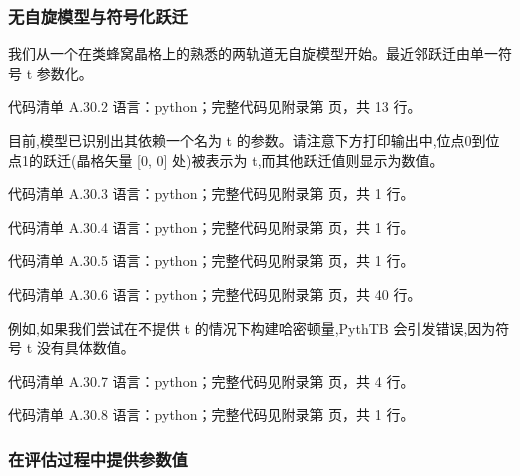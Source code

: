 \documentclass[lang=cn,scheme=chinese,color=blue,device=normal,toc=onecol,math=cm]{elegantbook}
\begin{document}
\subsubsection{无自旋模型与符号化跃迁}


我们从一个在类蜂窝晶格上的熟悉的两轨道无自旋模型开始。最近邻跃迁由单一符号 t 参数化。\par


\begin{codeindexbox}{代码清单 A.30.2}
语言：python；完整代码见附录第 \pageref{code:30:2} 页，共 13 行。
\end{codeindexbox}


目前,模型已识别出其依赖一个名为 t 的参数。请注意下方打印输出中,位点0到位点1的跃迁(晶格矢量 [0, 0] 处)被表示为 t,而其他跃迁值则显示为数值。\par


\begin{codeindexbox}{代码清单 A.30.3}
语言：python；完整代码见附录第 \pageref{code:30:3} 页，共 1 行。
\end{codeindexbox}


\begin{codeindexbox}{代码清单 A.30.4}
语言：python；完整代码见附录第 \pageref{code:30:4} 页，共 1 行。
\end{codeindexbox}


\begin{codeindexbox}{代码清单 A.30.5}
语言：python；完整代码见附录第 \pageref{code:30:5} 页，共 1 行。
\end{codeindexbox}


\begin{codeindexbox}{代码清单 A.30.6}
语言：python；完整代码见附录第 \pageref{code:30:6} 页，共 40 行。
\end{codeindexbox}


例如,如果我们尝试在不提供 t 的情况下构建哈密顿量,PythTB 会引发错误,因为符号 t 没有具体数值。\par


\begin{codeindexbox}{代码清单 A.30.7}
语言：python；完整代码见附录第 \pageref{code:30:7} 页，共 4 行。
\end{codeindexbox}


\begin{codeindexbox}{代码清单 A.30.8}
语言：python；完整代码见附录第 \pageref{code:30:8} 页，共 1 行。
\end{codeindexbox}


\subsubsection{在评估过程中提供参数值}
\end{document}
